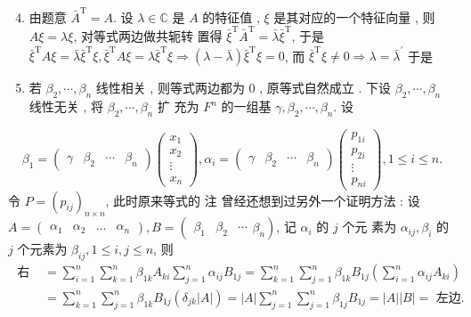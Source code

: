 \documentclass[10pt]{article}
\begin{document}
\begin{enumerate}
  \setcounter{enumi}{3}
  \item  由题意  $\bar{A}^{\mathrm{T}}=A$.  设  $\lambda \in \mathbb{C}$  是  $A$  的特征值 , $\xi$  是其对应的一个特征向量 ,  则  $A \xi=\lambda \xi$,  对等式两边做共轭转   置得  $\bar{\xi}^{\mathrm{T}} \bar{A}^{\mathrm{T}}=\bar{\lambda} \bar{\xi}^{\mathrm{T}}$,  于是  $\bar{\xi}^{\mathrm{T}} A \xi=\bar{\lambda} \bar{\xi}^{\mathrm{T}} \xi, \bar{\xi}^{\mathrm{T}} A \xi=\lambda \bar{\xi}^{\mathrm{T}} \xi \Longrightarrow(\lambda-\bar{\lambda}) \bar{\xi}^{\mathrm{T}} \xi=0$,  而  $\bar{\xi}^{\mathrm{T}} \xi \neq 0 \Longrightarrow \lambda=\bar{\lambda}^{\prime}$  于是 

  \item  若  $\beta_{2}, \cdots, \beta_{n}$  线性相关 ,  则等式两边都为  0 ,  原等式自然成立 .  下设  $\beta_{2}, \cdots, \beta_{n}$  线性无关 ,  将  $\beta_{2}, \cdots, \beta_{n}$  扩   充为  $F^{n}$  的一组基  $\gamma, \beta_{2}, \cdots, \beta_{n}$.  设 

\end{enumerate}
$$
\beta_{1}=\left(\begin{array}{llll}
\gamma & \beta_{2} & \cdots & \beta_{n}
\end{array}\right)\left(\begin{array}{c}
x_{1} \\
x_{2} \\
\vdots \\
x_{n}
\end{array}\right), \alpha_{i}=\left(\begin{array}{llll}
\gamma & \beta_{2} & \cdots & \beta_{n}
\end{array}\right)\left(\begin{array}{c}
p_{1 i} \\
p_{2 i} \\
\vdots \\
p_{n i}
\end{array}\right), 1 \leq i \leq n .
$$
 令  $P=\left(p_{i j}\right)_{n \times n}$,  此时原来等式的   注   曾经还想到过另外一个证明方法 :  设  $A=\left(\begin{array}{llll}\alpha_{1} & \alpha_{2} & \ldots & \alpha_{n}\end{array}\right), B=\left(\begin{array}{lll}\beta_{1} & \beta_{2} & \cdots\end{array} \beta_{n}\right)$,  记  $\alpha_{i}$  的  $j$  个元   素为  $\alpha_{i j}, \beta_{i}$  的  $j$  个元素为  $\beta_{i j}, 1 \leq i, j \leq n$,  则 
$$
\begin{aligned}
\text { 右边 } &=\sum_{i=1}^{n} \sum_{k=1}^{n} \beta_{1 k} A_{k i} \sum_{j=1}^{n} \alpha_{i j} B_{1 j}=\sum_{k=1}^{n} \sum_{j=1}^{n} \beta_{1 k} B_{1 j}\left(\sum_{i=1}^{n} \alpha_{i j} A_{k i}\right) \\
&=\sum_{k=1}^{n} \sum_{j=1}^{n} \beta_{1 k} B_{1 j}\left(\delta_{j k}|A|\right)=|A| \sum_{j=1}^{n} \sum_{j=1}^{n} \beta_{1 j} B_{1 j}=|A||B|=\text { 左边. }
\end{aligned}
$$
\end{document}

